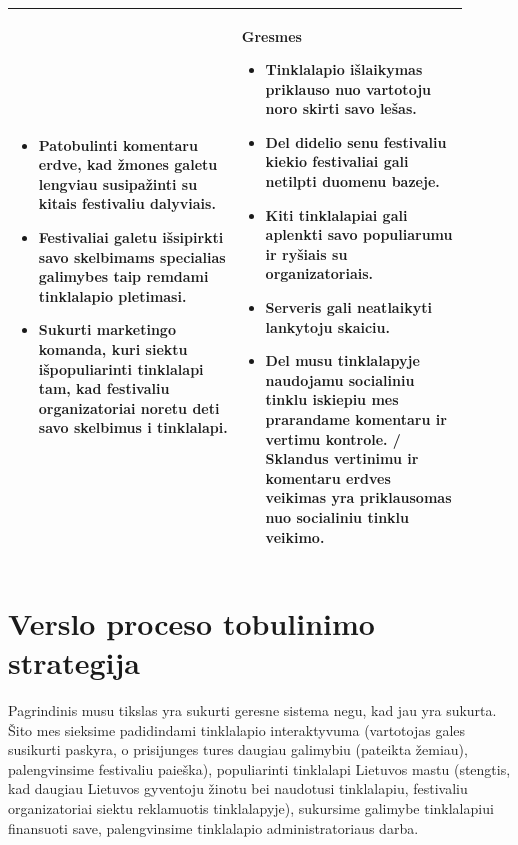 ﻿\documentclass{VUMIFPSkursinis}
\begin{document}
\begin{longtable}{|p{0.45\linewidth}|p{0.45\linewidth}|}
\begin{itemize}
	\item Patobulinti komentaru erdve, kad žmones galetu lengviau susipažinti su kitais festivaliu dalyviais.
	\item Festivaliai galetu išsipirkti savo  skelbimams specialias galimybes taip remdami tinklalapio pletimasi.
	\item Sukurti marketingo komanda, kuri siektu išpopuliarinti tinklalapi tam, kad festivaliu organizatoriai noretu deti savo skelbimus i tinklalapi.
  \end{itemize}
  &
  \textbf{Gresmes}
  \begin{itemize}
	\item Tinklalapio išlaikymas priklauso nuo vartotoju noro skirti savo lešas.
	\item Del didelio senu festivaliu kiekio festivaliai gali netilpti duomenu bazeje.
	\item Kiti tinklalapiai gali aplenkti savo populiarumu ir ryšiais su organizatoriais.
	\item Serveris gali neatlaikyti lankytoju skaiciu.
	\item Del musu tinklalapyje naudojamu socialiniu tinklu iskiepiu mes prarandame komentaru ir vertimu kontrole. / Sklandus vertinimu ir komentaru erdves veikimas yra priklausomas nuo socialiniu tinklu veikimo.
  \end{itemize}\\
  \hline
\end{longtable}

\section{Verslo proceso tobulinimo strategija}
Pagrindinis musu tikslas yra sukurti geresne sistema negu, kad jau yra sukurta. Šito mes sieksime padidindami tinklalapio interaktyvuma (vartotojas gales susikurti paskyra, o prisijunges tures daugiau galimybiu (pateikta žemiau), palengvinsime festivaliu paieška), populiarinti tinklalapi Lietuvos mastu (stengtis, kad daugiau Lietuvos gyventoju žinotu bei naudotusi tinklalapiu, festivaliu organizatoriai siektu reklamuotis tinklalapyje), sukursime galimybe tinklalapiui finansuoti save, palengvinsime tinklalapio administratoriaus darba.
\end{document}
